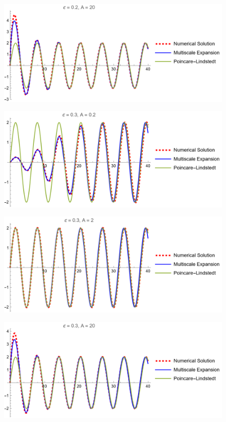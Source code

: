 \documentclass[12pt]{report}
\begin{document}
\begin{solution}
\begin{enumerate}
\begin{figure}[H]
        \end{figure}
        \begin{figure}[H]
            \center
            \includegraphics[width=.8\textwidth]{plots/2c9.png}
        \end{figure}
        \begin{figure}[H]
            \center
            \includegraphics[width=.8\textwidth]{plots/2c10.png}
        \end{figure}
        \begin{figure}[H]
            \center
            \includegraphics[width=.8\textwidth]{plots/2c11.png}
        \end{figure}
        \begin{figure}[H]
            \center
            \includegraphics[width=.8\textwidth]{plots/2c12.png}
        \end{figure}
    

\end{enumerate}
\end{solution}
\end{document}
